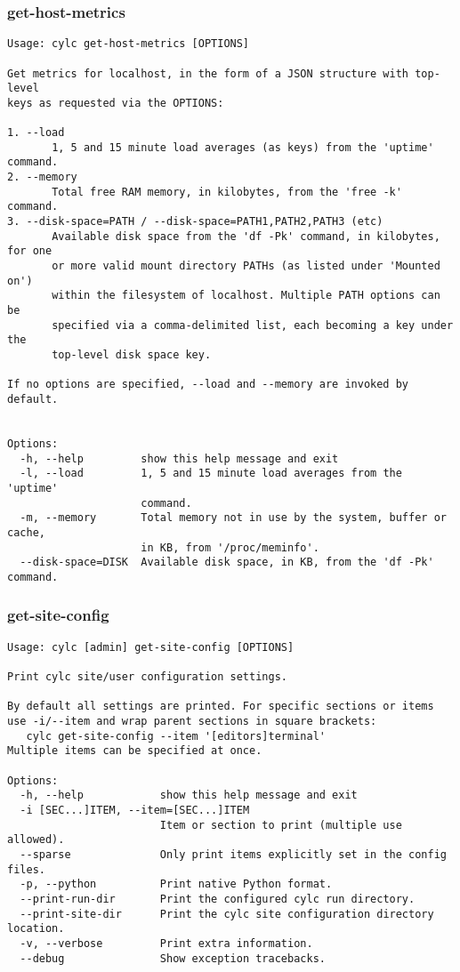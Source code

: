 \subsubsection{get-host-metrics}
\label{get-host-metrics}
\begin{lstlisting}
Usage: cylc get-host-metrics [OPTIONS]

Get metrics for localhost, in the form of a JSON structure with top-level
keys as requested via the OPTIONS:

1. --load
       1, 5 and 15 minute load averages (as keys) from the 'uptime' command.
2. --memory
       Total free RAM memory, in kilobytes, from the 'free -k' command.
3. --disk-space=PATH / --disk-space=PATH1,PATH2,PATH3 (etc)
       Available disk space from the 'df -Pk' command, in kilobytes, for one
       or more valid mount directory PATHs (as listed under 'Mounted on')
       within the filesystem of localhost. Multiple PATH options can be
       specified via a comma-delimited list, each becoming a key under the
       top-level disk space key.

If no options are specified, --load and --memory are invoked by default.


Options:
  -h, --help         show this help message and exit
  -l, --load         1, 5 and 15 minute load averages from the 'uptime'
                     command.
  -m, --memory       Total memory not in use by the system, buffer or cache,
                     in KB, from '/proc/meminfo'.
  --disk-space=DISK  Available disk space, in KB, from the 'df -Pk' command.
\end{lstlisting}
\subsubsection{get-site-config}
\label{get-site-config}
\begin{lstlisting}
Usage: cylc [admin] get-site-config [OPTIONS]

Print cylc site/user configuration settings.

By default all settings are printed. For specific sections or items
use -i/--item and wrap parent sections in square brackets:
   cylc get-site-config --item '[editors]terminal'
Multiple items can be specified at once.

Options:
  -h, --help            show this help message and exit
  -i [SEC...]ITEM, --item=[SEC...]ITEM
                        Item or section to print (multiple use allowed).
  --sparse              Only print items explicitly set in the config files.
  -p, --python          Print native Python format.
  --print-run-dir       Print the configured cylc run directory.
  --print-site-dir      Print the cylc site configuration directory location.
  -v, --verbose         Print extra information.
  --debug               Show exception tracebacks.
\end{lstlisting}
